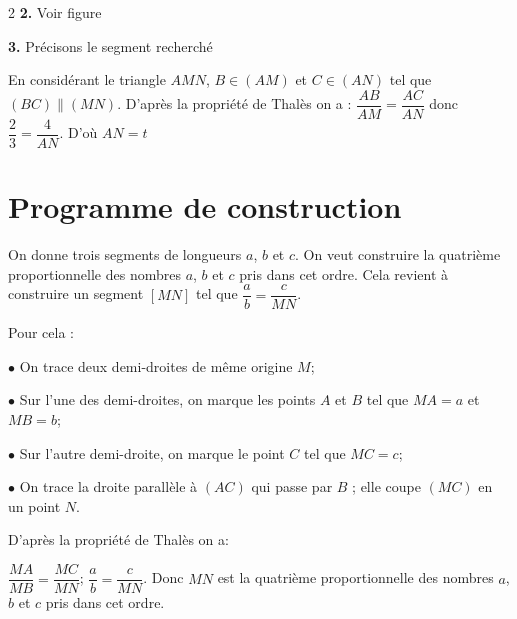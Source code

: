 \begin{multicols*}{2}
  	\textbf{2.}	Voir figure
  	
  	\textbf{3.} Précisons le segment recherché
  	
  	En considérant le triangle $AMN$, $B\in(AM) $ et $C\in(AN) $ tel que $(BC)\parallel (MN).$ D’après la propriété de Thalès on a : $\dfrac{AB}{AM}=\dfrac{AC}{AN}$ donc $\dfrac{2}{3}=\dfrac{4}{AN}$. D'où $AN=t$
  	\section*{Programme de construction}
  	On donne trois segments de longueurs $a$, $b$ et $c$. On veut construire la quatrième proportionnelle des nombres $a$, $b$ et $c$ pris dans cet ordre. Cela revient à construire un segment $[MN]$ tel que	$\dfrac{a}{b}=\dfrac{c}{MN}$.
  	
  	Pour cela :
  	
  	$\bullet$ On trace deux demi-droites de même origine $M$;
  	
  	$\bullet$ Sur l'une des demi-droites, on marque les points $A$ et $B$ tel que $MA=a$ et $MB = b$;
  	
  	$\bullet$ Sur l'autre demi-droite, on marque le point $C$ tel que $MC=c$;
  	
  	$\bullet$ On trace la droite parallèle à $(AC)$ qui passe par $B$ ; elle coupe $(MC)$ en un point $N$.
  	
  	D’après la propriété de Thalès on a:
  	
  	$\dfrac{MA}{MB}=\dfrac{MC}{MN}$;  $\dfrac{a}{b}=\dfrac{c}{MN}$. Donc $MN$ est la quatrième proportionnelle des nombres $a$, $b$ et $c$  pris dans cet ordre. 
  	

\end{multicols*}
